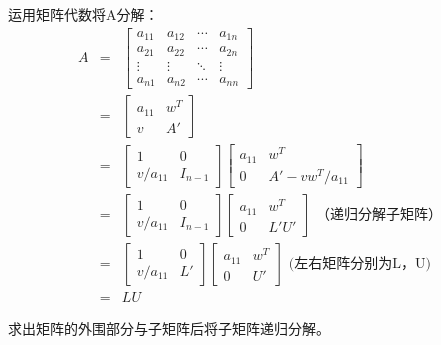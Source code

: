 运用矩阵代数将A分解：
\begin{eqnarray*}
	A&=&\left[\begin{array}{c|ccc}
			a_{11} & a_{12} & \cdots & a_{1n} \\
			\hline
			a_{21} & a_{22} & \cdots & a_{2n} \\
			\vdots & \vdots & \ddots & \vdots \\
			a_{n1} & a_{n2} & \cdots & a_{nn}
        \end{array} \right]\\
    &=&\left[\begin{array}{cc}
        a_{11}&w^T\\
        v&A'
    \end{array}\right]\\
    &=&\left[\begin{array}{cc}
        1&0\\
        v/a_{11}&I_{n-1}
    \end{array}\right]
    \left[\begin{array}{cc}
        a_{11}&w^T\\
        0&A'-vw^T/a_{11}
    \end{array}\right]\\
    &=&\left[\begin{array}{cc}
        1&0\\
        v/a_{11}&I_{n-1}
    \end{array}\right]
    \left[\begin{array}{cc}
        a_{11}&w^T\\
        0&L'U'
    \end{array}\right] \textrm{~（递归分解子矩阵）}\\
    &=&\left[\begin{array}{cc}
        1&0\\
        v/a_{11}&L'
    \end{array}\right]
    \left[\begin{array}{cc}
        a_{11}&w^T\\
        0&U'
    \end{array}\right]\textrm{~(左右矩阵分别为L，U)}\\
    &=&LU
\end{eqnarray*}

求出矩阵的外围部分与子矩阵后将子矩阵递归分解。

